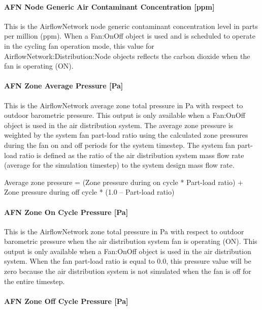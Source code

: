 \paragraph{AFN Node Generic Air Contaminant Concentration {[}ppm{]}}\label{afn-node-generic-air-contaminant-concentration-ppm}

This is the AirflowNetwork node generic contaminant concentration level in parts per million (ppm). When a Fan:OnOff object is used and is scheduled to operate in the cycling fan operation mode, this value for AirflowNetwork:Distribution:Node objects reflects the carbon dioxide when the fan is operating (ON).

\paragraph{AFN Zone Average Pressure {[}Pa{]}}\label{afn-zone-average-pressure-pa}

This is the AirflowNetwork average zone total pressure in Pa with respect to outdoor barometric pressure. This output is only available when a Fan:OnOff object is used in the air distribution system. The average zone pressure is weighted by the system fan part-load ratio using the calculated zone pressures during the fan on and off periods for the system timestep. The system fan part-load ratio is defined as the ratio of the air distribution system mass flow rate (average for the simulation timestep) to the system design mass flow rate.

Average zone pressure = (Zone pressure during on cycle * Part-load ratio) + Zone pressure during off cycle * (1.0 -- Part-load ratio)

\paragraph{AFN Zone On Cycle Pressure {[}Pa{]}}\label{afn-zone-on-cycle-pressure-pa}

This is the AirflowNetwork zone total pressure in Pa with respect to outdoor barometric pressure when the air distribution system fan is operating (ON). This output is only available when a Fan:OnOff object is used in the air distribution system. When the fan part-load ratio is equal to 0.0, this pressure value will be zero because the air distribution system is not simulated when the fan is off for the entire timestep.

\paragraph{AFN Zone Off Cycle Pressure {[}Pa{]}}\label{afn-zone-off-cycle-pressure-pa}

